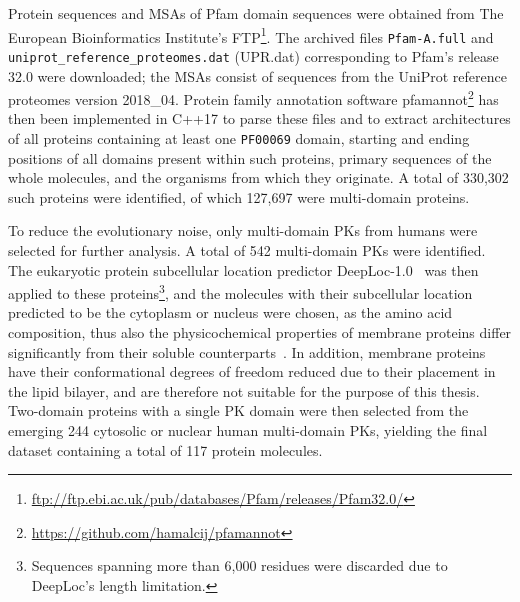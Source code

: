 \label{methods}

Protein sequences and MSAs of Pfam domain sequences were obtained from The European
Bioinformatics Institute's
FTP\footnote{\url{ftp://ftp.ebi.ac.uk/pub/databases/Pfam/releases/Pfam32.0/}}.
The archived files \texttt{Pfam-A.full} and \texttt{uniprot\_reference\_proteomes.dat}
(UPR.dat) corresponding to Pfam's release 32.0 were downloaded; the MSAs consist of
sequences from the UniProt reference proteomes version 2018\_04.
Protein family annotation software
pfamannot\footnote{\url{https://github.com/hamalcij/pfamannot}} has then been implemented
in C++17 to parse these files and to extract architectures of all proteins containing at
least one \texttt{PF00069} domain, starting and ending positions of all domains present
within such proteins, primary sequences of the whole molecules, and the organisms from
which they originate.
A total of 330,302 such proteins were identified, of which 127,697 were multi-domain
proteins.

To reduce the evolutionary noise, only multi-domain PKs from humans were selected for
further analysis.
A total of 542 multi-domain PKs were identified.
The eukaryotic protein subcellular location predictor
DeepLoc-1.0~\cite{almagro2017deeploc} was then applied to these
proteins\footnote{Sequences spanning more than 6,000 residues were discarded due to
DeepLoc's length limitation.}, and the molecules with their subcellular location
predicted to be the cytoplasm or nucleus were chosen, as the amino acid composition, thus
also the physicochemical properties of membrane proteins differ significantly from their
soluble counterparts~\cite{capaldi1972low, von1988topogenic, tusnady1998principles}.
In addition, membrane proteins have their conformational degrees of freedom reduced due to
their placement in the lipid bilayer, and are therefore not suitable for the purpose of
this thesis.
Two-domain proteins with a single PK domain were then selected from the emerging 244
cytosolic or nuclear human multi-domain PKs, yielding the final dataset containing a
total of 117 protein molecules.

